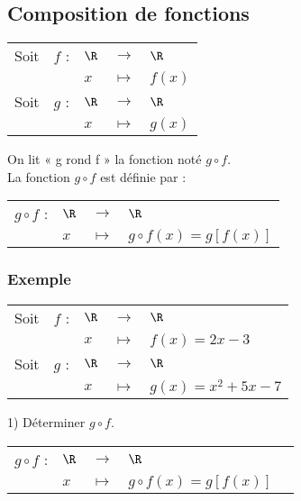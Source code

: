 \subsection{Composition de fonctions}

\begin{tabular}{lllll}
Soit & $f$ : & $\R$ & $\longrightarrow$ & $\R$ \\
& & $x$ & $\longmapsto$ & $f\left(x\right)$ \\
Soit & $g$ : & $\R$ & $\longrightarrow$ & $\R$ \\
& & $x$ & $\longmapsto$ & $g\left(x\right)$ \\
\end{tabular}

\vspace*{.3cm}

On lit « g rond f » la fonction noté $g \circ f$.  \\

La fonction $g \circ f$ est définie par : \\

\begin{tabular}{llll}
$g \circ f$ : & $\R$ & $\longrightarrow$ & $\R$ \\
& $x$ & $\longmapsto$ & $g \circ f\left(x\right) = g\left[f\left(x\right)\right]$ \\
\end{tabular}

\vspace*{.3cm}

\subsubsection{Exemple}

\begin{tabular}{lllll}
Soit & $f$ : & $\R$ & $\longrightarrow$ & $\R$ \\
& & $x$ & $\longmapsto$ & $f\left(x\right) = 2x - 3$\\
Soit & $g$ : & $\R$ & $\longrightarrow$ & $\R$ \\
& & $x$ & $\longmapsto$ & $g\left(x\right) = x^2 + 5x - 7$ \\
\end{tabular}

\vspace*{.3cm}

1) Déterminer $g \circ f$.

\begin{tabular}{lllll}
$g \circ f$ : & $\R$ & $\longrightarrow$ & $\R$ \\
& $x$ & $\longmapsto$ & $g \circ f\left(x\right) = g\left[f\left(x\right)\right]$ \\
\end{tabular}

